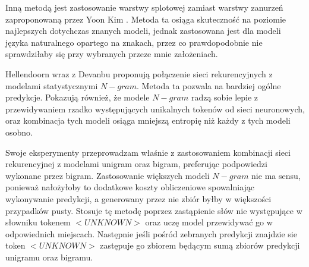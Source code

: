 Inną metodą jest zastosowanie warstwy splotowej zamiast warstwy zanurzeń zaproponowaną przez Yoon Kim \cite{kim}. Metoda ta osiąga skuteczność 
na poziomie najlepszych dotychczas znanych modeli, jednak zastosowana jest dla modeli języka naturalnego opartego na znakach, przez co 
prawdopodobnie nie sprawdziłaby się przy wybranych przeze mnie założeniach. 

Hellendoorn wraz z Devanbu \cite{hellendoorn} proponują połączenie sieci rekurencyjnych z modelami statystycznymi \begin{math}N-gram\end{math}. Metoda ta pozwala na bardziej 
ogólne predykcje. Pokazują również, że modele \begin{math}N-gram\end{math} radzą sobie lepie z przewidywaniem rzadko występujących unikalnych tokenów od sieci neuronowych, 
oraz kombinacja tych modeli osiąga mniejszą entropię niż każdy z tych modeli osobno. 

Swoje eksperymenty przeprowadzam właśnie z zastosowaniem kombinacji sieci rekurencyjnej z modelami unigram oraz bigram, preferując podpowiedzi wykonane przez bigram. Zastosowanie 
większych modeli \begin{math}N-gram\end{math} nie ma sensu, ponieważ nałożyłoby to dodatkowe koszty obliczeniowe spowalniając wykonywanie predykcji, a generowany przez nie zbiór 
byłby w większości przypadków pusty. 
Stosuje tę metodę poprzez zastąpienie słów nie występujące w słowniku tokenem \begin{math}<UNKNOWN>\end{math} oraz uczę model przewidywać go w odpowiednich miejscach. Następnie jeśli pośród 
zebranych predykcji znajdzie sie token \begin{math}<UNKNOWN>\end{math} zastępuje go zbiorem będącym sumą zbiorów predykcji unigramu oraz bigramu.  
